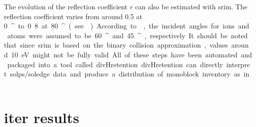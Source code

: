 The evolution of the reflection coefficient $r$ can also be estimated with \gls{srim}.
The reflection coefficient varies from around 0.5 at \SI{0}{^\circ} to 0.8 at \SI{80}{^\circ} (see ).
According to , the incident angles for ions and atoms were assumed to be \SI{60}{^\circ} and \SI{45}{^\circ}, respectively.
It should be noted that since \gls{srim} is based on the binary collision approximation, values around \SI{10}{eV} might not be fully valid.

All of these steps have been automated and packaged into a tool called divHretention.
divHretention can directly interpret \gls{solps}/\gls{soledge} data and produce a distribution of \gls{monoblock} \gls{inventory} as in .

\section{\gls{iter} results}

